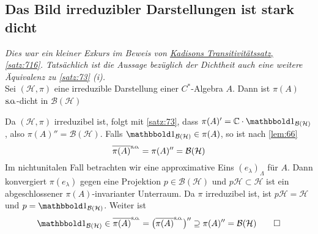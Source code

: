 \subsection{Das Bild irreduzibler Darstellungen ist stark dicht} %
\label{sub:das_bild_irreduzibler_darstellungen}
\emph{Dies war ein kleiner Exkurs im Beweis von \hyperref[satz:716]{Kadisons Transitivitätssatz, \ref*{satz:716}}. 
Tatsächlich ist die Aussage bezüglich der Dichtheit auch eine weitere Äquivalenz zu \autoref{satz:73} (i).}\smallskip \\
Sei $(\mathcal{H},\pi)$ eine irreduzible Darstellung einer $C^*$-Algebra $A$.
Dann ist $\pi(A)$ $\mathrm{\mkern.3mu s\mkern-1.4mu.\mkern-.6mu o\mkern-1.7mu.}$-dicht in $\mathcal{B}(\mathcal{H})$
\emph{}
\begin{beweis}
	Da $(\mathcal{H},\pi)$ irreduzibel ist, folgt mit \autoref{satz:73}, dass $\pi(A)'= \mathbb{C} \cdot \ind_{\mathcal{B}(\mathcal{H})}$, also $\pi(A)''=\mathcal{B}(\mathcal{H})$.
	Falls $\ind_{\mathcal{B}(\mathcal{H})} \in \pi(A)$, so ist nach \autoref{lem:66}
	\[
		\overline{\pi(A)}^{\raisemath{-1pt}{\so}}= \pi(A)''=\mathcal{B}(\mathcal{H})
	\]
	Im nichtunitalen Fall betrachten wir eine approximative Eins $(e_\lambda)_\Lambda$ für $A$.
	Dann konvergiert $\pi(e_\lambda)$ gegen eine Projektion $p \in \mathcal{B}(\mathcal{H})$ und $p \mathcal{H} \subset \mathcal{H}$ ist ein abgeschlossener $\pi(A)$-invarianter Unterraum.
	Da $\pi$ irreduzibel ist, ist $p \mathcal{H}=\mathcal{H}$ und $p=\ind_{\mathcal{B}(\mathcal{H})}$.
	Weiter ist 
	\[
		\ind_{\mathcal{B}(\mathcal{H})} \in  \overline{\pi(A)}^\so = \enbrace[\big]{\overline{\pi(A)}^\so}'' \supseteq \pi(A)'' = \mathcal{B}(\mathcal{H}) \qedhere
	\]
\end{beweis}

\printindex
\printbibliography
\listoffigures
\todototoc
{}
